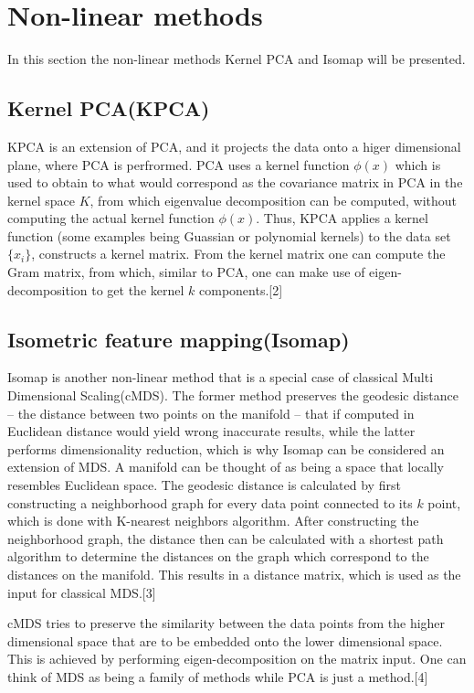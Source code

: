 \section*{Non-linear methods}
In this section the non-linear methods Kernel PCA and Isomap will be presented.



\subsection*{Kernel PCA(KPCA)}
KPCA is an extension of PCA, and it projects the data onto a higer dimensional plane, where PCA is perfrormed. PCA uses a kernel function $\phi (x)$ which is used to obtain to what would correspond as the covariance matrix in PCA in the kernel space $K$, from which eigenvalue decomposition can be computed, without computing the actual kernel function $\phi (x)$. Thus, KPCA applies a kernel function (some examples being Guassian or polynomial kernels) to the data set $ \{x_{i} \}$, constructs a kernel matrix. From the kernel matrix one can compute the Gram matrix, from which, similar to PCA, one can make use of eigen-decomposition to get the kernel $k$ components.[2]


\subsection*{Isometric feature mapping(Isomap)}
Isomap is another non-linear method that is a special case of classical Multi Dimensional Scaling(cMDS). The former method preserves the geodesic distance -- the distance between two points on the manifold -- that if computed in Euclidean distance would yield wrong inaccurate results, while the latter performs dimensionality reduction, which is why Isomap can be considered an extension of MDS. A manifold can be thought of as being a space that locally resembles Euclidean space. The geodesic distance is calculated by first constructing a neighborhood graph for every data point connected to its $k$ point, which is done with K-nearest neighbors algorithm. After constructing the neighborhood graph, the distance then can be calculated with a shortest path algorithm to determine the distances on the graph which correspond to the distances on the manifold. This results in a distance matrix, which is used as the input for classical MDS.[3]

cMDS tries to preserve the similarity between the data points from the higher dimensional space that are to be embedded onto the lower dimensional space. This is achieved by performing eigen-decomposition on the matrix input. One can think of MDS as being a family of methods while PCA is just a method.[4]


